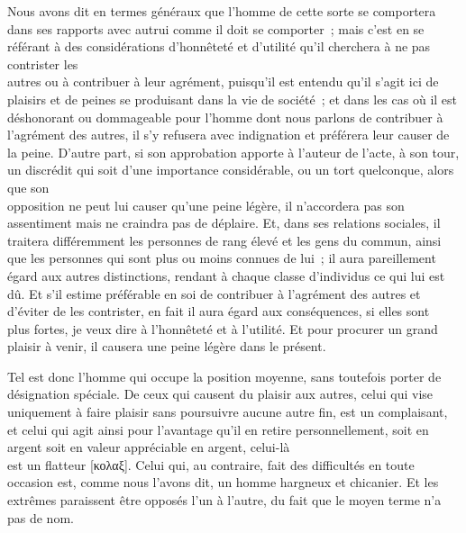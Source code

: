 \documentclass[french,twoside]{book} %
\begin{document}
Nous avons dit en termes généraux que l’homme de cette sorte se comportera dans ses rapports avec autrui comme il doit se comporter ; mais c’est en se référant à des considérations d’honnêteté et d’utilité qu’il cherchera à ne pas contrister les \\
autres ou à contribuer à leur agrément, puisqu’il est entendu qu’il s’agit ici de plaisirs et de peines se produisant dans la vie de société ; et dans les cas où il est déshonorant ou dommageable pour l’homme dont nous parlons de contribuer à l’agrément des autres, il s’y refusera avec indignation et préférera leur causer de la peine. D’autre part, si son approbation apporte à l’auteur de l’acte, à son tour, un discrédit qui soit d’une importance considérable, ou un tort quelconque, alors que son \\
opposition ne peut lui causer qu’une peine légère, il n’accordera pas son assentiment mais ne craindra pas de déplaire. Et, dans ses relations sociales, il traitera différemment les  personnes de rang élevé et les gens du commun, ainsi que les personnes qui sont plus ou moins connues de lui ; il aura pareillement égard aux autres distinctions, rendant à chaque classe d’individus ce qui lui est dû. Et s’il estime préférable en soi de contribuer à l’agrément des autres et d’éviter de les contrister, en fait il aura égard aux conséquences, si elles sont \\
plus fortes, je veux dire à l’honnêteté et à l’utilité. Et pour procurer un grand plaisir à venir, il causera une peine légère dans le présent.\par
Tel est donc l’homme qui occupe la position moyenne, sans toutefois porter de désignation spéciale. De ceux qui causent du plaisir aux autres, celui qui vise uniquement à faire plaisir sans poursuivre aucune autre fin, est un complaisant, et celui qui agit ainsi pour l’avantage qu’il en retire personnellement, soit en argent soit en valeur appréciable en argent, celui-là \\
est un flatteur [κολαξ]. Celui qui, au contraire, fait des difficultés en toute occasion est, comme nous l’avons dit, un homme hargneux et chicanier. Et les extrêmes paraissent être opposés l’un à l’autre, du fait que le moyen terme n’a pas de nom.
\end{document}
